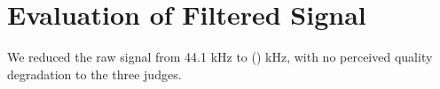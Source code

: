 \section{Evaluation of Filtered Signal}

We reduced the raw signal from 44.1 kHz to () kHz, 
with no perceived quality degradation to the three judges.
